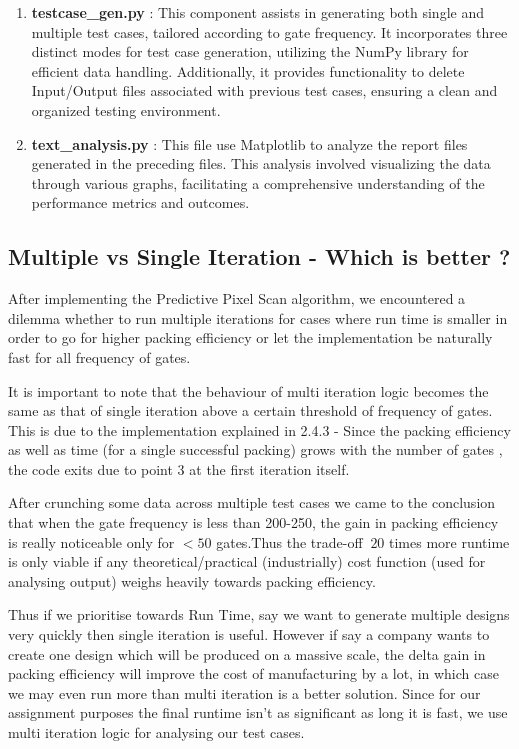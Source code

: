 \documentclass[12pt, a4paper,openany]{article}
\begin{document}
\begin{enumerate}
    \item \textbf{testcase\_gen.py} : This component assists in generating both single and multiple test cases, tailored according to gate frequency. It incorporates three distinct modes for test case generation, utilizing the NumPy library for efficient data handling. Additionally, it provides functionality to delete Input/Output files associated with previous test cases, ensuring a clean and organized testing environment. 
    \item \textbf{text\_analysis.py} : This file use Matplotlib to analyze the report files generated in the preceding files. This analysis involved visualizing the data through various graphs, facilitating a comprehensive understanding of the performance metrics and outcomes.
\end{enumerate}

\subsection{Multiple vs Single Iteration - Which is better ?}\label{subsec:MSP}
\begin{flushleft}
    After implementing the Predictive Pixel Scan algorithm, we encountered a dilemma 
    whether to run multiple iterations for cases where run time is smaller in order to go for higher packing efficiency or let the implementation be naturally fast for all frequency of gates.
\end{flushleft}
\begin{flushleft}
    It is important to note that the behaviour of multi iteration logic becomes the same as that of single iteration above a certain threshold of frequency of gates.
    This is due to the implementation explained in 2.4.3 - Since the packing efficiency as well as time (for a single successful packing) grows with the number of gates , the code exits due to point 3 at the first iteration itself.
\end{flushleft}
\begin{flushleft}
    After crunching some data across multiple test cases we came to the conclusion that when the gate frequency is less than 200-250, the gain in packing efficiency is really noticeable only for \(<50\) gates.Thus the trade-off \(~20\) times more runtime is only viable if any theoretical/practical (industrially) cost function (used for analysing output) weighs heavily towards packing efficiency. 
\end{flushleft}
\begin{flushleft}
    Thus if we prioritise towards Run Time, say we want to generate multiple designs very quickly then single iteration is useful. However if say a company wants to create one design which will be produced on a massive scale, the delta gain in packing efficiency will improve the cost of manufacturing by a lot, in which case we may even run more than multi iteration is a better solution. Since for our assignment purposes the final runtime isn't as significant as long it is fast, we use multi iteration logic for analysing our test cases. 
\end{flushleft}
\end{document}

